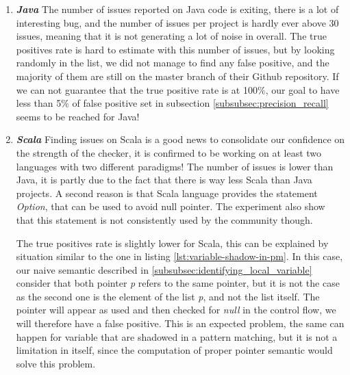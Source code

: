 \begin{enumerate}
	\item \textbf{\textit{Java}} \newline
	The number of issues reported on Java code is exiting, there is a lot of interesting bug, and the number of issues per project is hardly ever above 30 issues, meaning that it is not generating a lot of noise in overall.
	The true positives rate is hard to estimate with this number of issues, but by looking randomly in the list, we did not manage to find any false positive, and the majority of them are still on the master branch of their Github repository. 
	If we can not guarantee that the true positive rate is at 100\%, our goal to have less than 5\% of false positive set in subsection \ref{subsubsec:precision_recall} seems to be reached for Java!
    \newline
	\item \textbf{\textit{Scala}} \newline
	Finding issues on Scala is a good news to consolidate our confidence on the strength of the checker, it is confirmed to be working on at least two languages with two different paradigms!
	The number of issues is lower than Java, it is partly due to the fact that there is way less Scala  than Java projects.
	A second reason is that Scala language provides the statement \emph{Option}, that can be used to avoid null pointer.
	The experiment also show that this statement is not consistently used by the community though.
	
	
	
	The true positives rate is slightly lower for Scala, this can be explained by situation similar to the one in listing \ref{lst:variable-shadow-in-pm}. 
	In this case, our naive semantic described in \ref{subsubsec:identifying_local_variable} consider that both pointer \emph{p} refers to the same pointer, but it is not the case as the second one is the element of the list \emph{p}, and not the list itself.
	The pointer will appear as used and then checked for \emph{null} in the control flow, we will therefore have a false positive.
	This is an expected problem, the same can happen for variable that are shadowed in a pattern matching, but it is not a limitation in itself, since the computation of proper pointer semantic would solve this problem.
	

\end{enumerate}
